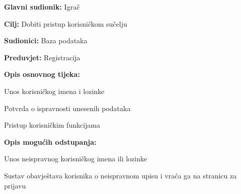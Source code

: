 					\noindent {}
					\begin{packed_item}
						
						\item \textbf{Glavni sudionik: }Igrač
						\item  \textbf{Cilj:} Dobiti pristup korisničkom sučelju
						\item  \textbf{Sudionici:} Baza podataka
						\item  \textbf{Preduvjet:} Registracija
						\item  \textbf{Opis osnovnog tijeka:}
						
						\item[] \begin{packed_enum}
							
							\item Unos korisničkog imena i lozinke
							\item Potvrda o ispravnosti unesenih podataka
							\item Pristup korisničkim funkcijama
						\end{packed_enum}
						
						\item  \textbf{Opis mogućih odstupanja:}
						
						\item[] \begin{packed_item}
							
							\item Unos neispravnog korisničkog imena ili lozinke
							\item[] \begin{packed_enum}
								
								\item Sustav obavještava korisnika o neispravnom upisu i vraća ga na stranicu za prijavu
								
							\end{packed_enum}
							
						\end{packed_item}
					\end{packed_item}
					
